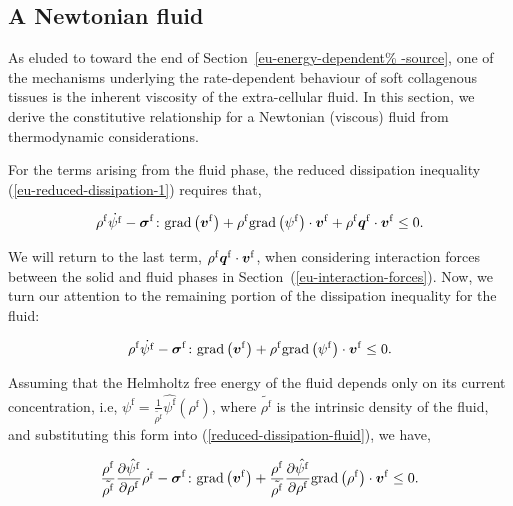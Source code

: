 \subsection{A Newtonian fluid}
\label{eu-newtonian-fluid}

As eluded to toward the end of Section~\ref{eu-energy-dependent%
  -source}, one of the mechanisms underlying the rate-dependent
behaviour of soft collagenous tissues is the inherent viscosity of the
extra-cellular fluid. In this section, we derive the constitutive
relationship for a Newtonian (viscous) fluid from thermodynamic
considerations.

For the terms arising from the fluid phase, the reduced dissipation
inequality (\ref{eu-reduced-dissipation-1}) requires that,

\begin{equation*}
\rho^{\mathrm{f}} \dot{\psi^{\mathrm{f}}}
-\mbox{\boldmath$\sigma$}^{\mathrm{f}}\colon\mathrm{grad}\left(\mbox{\boldmath$ v$}^{\mathrm{f}}\right)+
\rho^{\mathrm{f}} \mathrm{grad}\left(\psi^{\mathrm{f}}\right)
\cdot\mbox{\boldmath$ v$}^{\mathrm{f}} +\rho^{\mathrm{f}}
\mbox{\boldmath$ q$}^{\mathrm{f}}\cdot\mbox{\boldmath$ v$}^{\mathrm{f}} \leq 0.
\end{equation*}

\noindent We will return to the last term, $\rho^{\mathrm{f}}
\mbox{\boldmath$ q$}^{\mathrm{f}} \cdot \mbox{\boldmath$ v$}^{\mathrm{f}}$, when considering interaction
forces between the solid and fluid phases in
Section~(\ref{eu-interaction-forces}). Now, we turn our attention to
the remaining portion of the dissipation inequality for the fluid:

\begin{equation}
\rho^{\mathrm{f}} \dot{\psi^{\mathrm{f}}} -\mbox{\boldmath$\sigma$}^{\mathrm{f}} \colon
\mathrm{grad}\left(\mbox{\boldmath$ v$}^{\mathrm{f}}\right)+ \rho^{\mathrm{f}}
\mathrm{grad} \left(\psi^{\mathrm{f}}\right) \cdot\mbox{\boldmath$ v$}^{\mathrm{f}}
\leq 0.
\label{reduced-dissipation-fluid}
\end{equation}

Assuming that the Helmholtz free energy of the fluid depends only on
its current concentration, i.e, $\psi^{\mathrm{f}} = \frac{1}
{\tilde{\rho^{\mathrm{f}}}} \hat{\psi^{\mathrm{f}}}
(\rho^{\mathrm{f}})$, where $\tilde{\rho^{\mathrm{f}}}$ is the
intrinsic density of the fluid, and substituting this form into
(\ref{reduced-dissipation-fluid}), we have,

\begin{equation*}
\frac{\rho^{\mathrm{f}}}{\tilde{\rho^{\mathrm{f}}}}
\frac{\partial \hat{\psi^{\mathrm{f}}}}{\partial \rho^{\mathrm{f}}}
\dot{\rho^{\mathrm{f}}}
-\mbox{\boldmath$\sigma$}^{\mathrm{f}}\colon\mathrm{grad}
\left(\mbox{\boldmath$ v$}^{\mathrm{f}}\right) +
\frac{\rho^{\mathrm{f}}}{\tilde{\rho^{\mathrm{f}}}}
\frac{\partial \hat{\psi^{\mathrm{f}}}}{\partial \rho^{\mathrm{f}}}
\mathrm{grad}\left(\rho^{\mathrm{f}}\right) 
\cdot\mbox{\boldmath$ v$}^{\mathrm{f}}
\leq 0.
\end{equation*}

